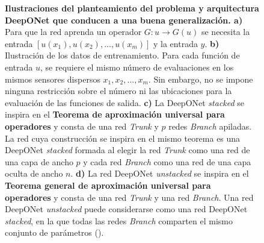 \documentclass[
  spanish,
  us-letterpaper,
]{scrreprt}
\theoremstyle{plain}
\theoremstyle{definition}
\theoremstyle{remark}
\begin{document}
\begin{figure}


\caption{\label{fig-deeponet-arch}\textbf{Ilustraciones del
planteamiento del problema y arquitectura DeepONet que conducen a una
buena generalización. a)} Para que la red aprenda un operador
\(G : u \rightarrow G(u)\) se necesita la entrada
\([u(x_1), u(x_2), ..., u(x_m)]\) y la entrada \(y\). \textbf{b)}
Ilustración de los datos de entrenamiento. Para cada función de entrada
\(u\), se requiere el mismo número de evaluaciones en los mismos
sensores dispersos \(x_1, x_2, ..., x_m\). Sin embargo, no se impone
ninguna restricción sobre el número ni las ubicaciones para la
evaluación de las funciones de salida. \textbf{c)} La DeepONet
\emph{stacked} se inspira en el \textbf{Teorema de aproximación
universal para operadores} y consta de una red \emph{Trunk} y \(p\)
redes \emph{Branch} apiladas. La red cuya construcción se inspira en el
mismo teorema es una DeepONet \emph{stacked} formada al elegir la red
\emph{Trunk} como una red de una capa de ancho \(p\) y cada red
\emph{Branch} como una red de una capa oculta de ancho \(n\).
\textbf{d)} La red DeepONet \emph{unstacked} se inspira en el
\textbf{Teorema general de aproximación universal para operadores} y
consta de una red \emph{Trunk} y una red \emph{Branch}. Una red DeepONet
\emph{unstacked} puede considerarse como una red DeepONet
\emph{stacked}, en la que todas las redes \emph{Branch} comparten el
mismo conjunto de parámetros ().}

\end{figure}%
\end{document}
